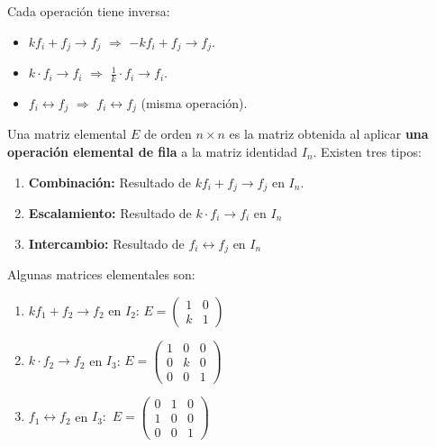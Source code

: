 \begin{rem}\label{rem:prop-elementales}
Cada operación tiene inversa:
  \begin{itemize}
  \item $k f_i + f_j \to f_j$ $\Rightarrow$ $-k f_i + f_j \to f_j.$
  \item $k \cdot f_i \to f_i$ $\Rightarrow$ $\frac{1}{k} \cdot f_i \to f_i.$
  \item $f_i \leftrightarrow f_j$ $\Rightarrow$ $f_i \leftrightarrow f_j$ (misma operación).
  \end{itemize}
\end{rem}

\begin{definition}
Una matriz elemental $E$ de orden $n \times n$ es la matriz obtenida al aplicar \textbf{una operación elemental de fila} a la matriz identidad $I_n$. Existen tres tipos:

\begin{enumerate}
\item \textbf{Combinación:} Resultado de $k f_i + f_j \to f_j$ en $I_n.$ 
  
\item \textbf{Escalamiento:} Resultado de $k \cdot f_i \to f_i$ en $I_n$ 
  
\item \textbf{Intercambio:} Resultado de $f_i \leftrightarrow f_j$ en $I_n$ 
\end{enumerate}
\end{definition}

\begin{example} Algunas matrices elementales son:
\begin{enumerate}
\item $k f_1 + f_2 \to f_2$ en $I_2$: $E = \begin{pmatrix} 1 & 0 \\ k & 1 \end{pmatrix}$
\item $k \cdot f_2 \to f_2$ en $I_3$: $E = \begin{pmatrix} 1 & 0 & 0 \\ 0 & k & 0 \\ 0 & 0 & 1 \end{pmatrix}$
\item $f_1 \leftrightarrow f_2$ en $I_3:$ $E = \begin{pmatrix} 0 & 1 & 0 \\ 1 & 0 & 0 \\ 0 & 0 & 1 \end{pmatrix}$
\end{enumerate}
\end{example}

